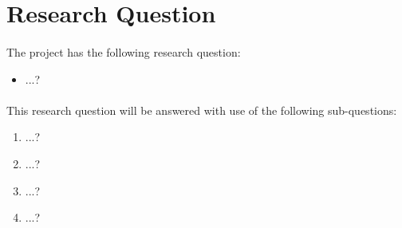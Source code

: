 \section{Research Question}
\paragraph{}
The project has the following research question:
\begin{itemize}
	\item ...?
\end{itemize}

\paragraph{}
This research question will be answered with use of the following sub-questions:
\begin{enumerate}
    \item ...?
    \item ...?
    \item ...?
    \item ...?
\end{enumerate}


